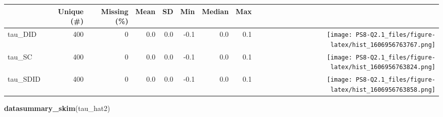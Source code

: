 \documentclass[
]{article}
\newenvironment{Shaded}{\begin{snugshade}}{\end{snugshade}}
\newcommand{\DataTypeTok}[1]{\textcolor[rgb]{0.13,0.29,0.53}{#1}}
\newcommand{\DecValTok}[1]{\textcolor[rgb]{0.00,0.00,0.81}{#1}}
\newcommand{\KeywordTok}[1]{\textcolor[rgb]{0.13,0.29,0.53}{\textbf{#1}}}
\newcommand{\NormalTok}[1]{#1}
\newcommand{\OperatorTok}[1]{\textcolor[rgb]{0.81,0.36,0.00}{\textbf{#1}}}
\newcommand{\StringTok}[1]{\textcolor[rgb]{0.31,0.60,0.02}{#1}}
\begin{document}
\begin{Shaded}
\end{Shaded}

\begin{table}[H]
\centering
\begin{tabular}[t]{lrrrrrrr>{}r}
\toprule
  & Unique (\#) & Missing (\%) & Mean & SD & Min & Median & Max &   \\
\midrule
tau\_DID & 400 & 0 & 0.0 & 0.0 & -0.1 & 0.0 & 0.1 & \texttt{[image: PS8-Q2.1\_files/figure-latex/hist\_1606956763767.png]}\\
tau\_SC & 400 & 0 & 0.0 & 0.0 & -0.1 & 0.0 & 0.1 & \texttt{[image: PS8-Q2.1\_files/figure-latex/hist\_1606956763824.png]}\\
tau\_SDID & 400 & 0 & 0.0 & 0.0 & -0.1 & 0.0 & 0.1 & \texttt{[image: PS8-Q2.1\_files/figure-latex/hist\_1606956763858.png]}\\
\bottomrule
\end{tabular}
\end{table}

\begin{Shaded}
\begin{Highlighting}[]
\KeywordTok{datasummary_skim}\NormalTok{(tau_hat2)}
\end{Highlighting}
\end{Shaded}
\end{document}
